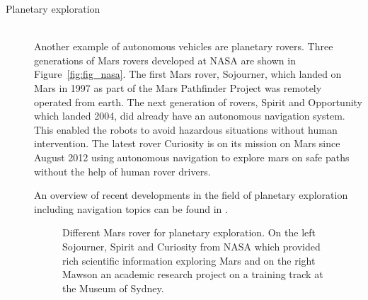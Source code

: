 \begin{description}
\item[Planetary exploration]\hfill \\
Another example of autonomous vehicles are planetary rovers.
Three generations of Mars rovers developed at NASA are shown in Figure~\ref{fig:fig_nasa}. 
The first Mars rover, Sojourner, which landed on Mars in 1997 as part of the Mars Pathfinder Project was remotely operated from earth. 
The next generation of rovers, Spirit and Opportunity which landed 2004, did already have an autonomous navigation system. This enabled the robots to avoid hazardous situations without human intervention. 
The latest rover Curiosity is on its mission on Mars since August 2012 using autonomous navigation to explore mars on safe paths without the help of human rover drivers.

An overview of recent developments in the field of planetary exploration including navigation topics can be found in \cite{PavoneAcikmese2014rover}.

\begin{figure}[thpb]
	  \myfloatalign
      \footnotesize
      \centering
   \caption[Mars rover]{Different Mars rover for planetary exploration. On the left Sojourner, Spirit and Curiosity from NASA which provided rich scientific information exploring Mars and on the right Mawson an academic research project on a training track at the Museum of Sydney.}
   \label{fig:fig_rover}
\end{figure}


\end{description}

